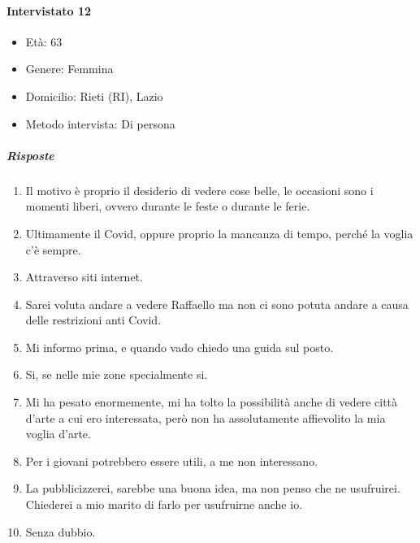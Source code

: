 \documentclass{article}
\begin{document}
\paragraph{Intervistato 12}
\begin{itemize}
\item Età: 63
\item Genere: Femmina
\item Domicilio: Rieti (RI), Lazio
\item Metodo intervista: Di persona
\end{itemize}
\subparagraph{Risposte}
\begin{enumerate}
\item Il motivo è proprio il desiderio di vedere cose belle, le occasioni sono i momenti liberi, ovvero durante le feste o durante le ferie.
\item Ultimamente il Covid, oppure proprio la mancanza di tempo, perché la voglia c’è sempre.
\item Attraverso siti internet.
\item Sarei voluta andare a vedere Raffaello ma non ci sono potuta andare a causa delle restrizioni anti Covid.
\item Mi informo prima, e quando vado chiedo una guida sul posto.
\item Si, se nelle mie zone specialmente si.
\item Mi ha pesato enormemente, mi ha tolto la possibilità anche di vedere città d’arte a cui ero interessata, però non ha assolutamente affievolito la mia voglia d’arte.
\item Per i giovani potrebbero essere utili, a me non interessano.
\item La pubblicizzerei, sarebbe una buona idea, ma non penso che ne usufruirei. Chiederei a mio marito di farlo per usufruirne anche io.
\item Senza dubbio.
\end{enumerate}
\end{document}
